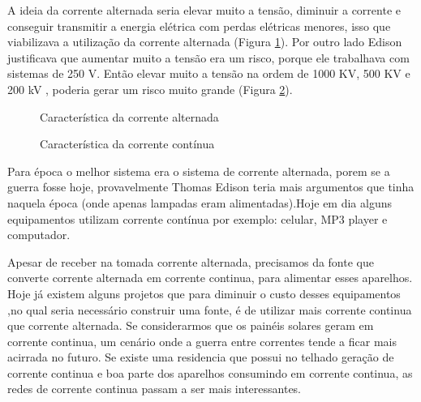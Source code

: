 A ideia da corrente alternada seria elevar muito a tensão, diminuir
a corrente e conseguir transmitir a energia elétrica com perdas elétricas
menores, isso que viabilizava a utilização da corrente alternada (Figura \ref{fig:corrente-alternada}).
Por outro lado Edison justificava que aumentar muito a tensão era
um risco, porque ele trabalhava com sistemas de 250 V. Então elevar
muito a tensão na ordem de 1000 KV, 500 KV e 200 kV , poderia gerar
um risco muito grande (Figura \ref{fig:corrente-continua}). 
\begin{figure}[H]
\begin{center}
\caption{\label{fig:corrente-alternada} Característica da corrente alternada}
\end{center}
\end{figure}




\begin{figure}[H]
\begin{center}
\caption{\label{fig:corrente-continua}Característica da corrente contínua}
\end{center}
\end{figure}

Para época o melhor sistema era o sistema de corrente alternada, porem
se a guerra fosse hoje, provavelmente Thomas Edison teria mais argumentos
que tinha naquela época (onde apenas lampadas eram alimentadas).Hoje
em dia alguns equipamentos utilizam corrente contínua por exemplo:
celular, MP3 player e computador.

Apesar de receber na tomada corrente alternada, precisamos da fonte
que converte corrente alternada em corrente continua, para alimentar
esses aparelhos. Hoje já existem alguns projetos que para diminuir
o custo desses equipamentos ,no qual seria necessário construir uma
fonte, é de utilizar mais corrente continua que corrente alternada.
Se considerarmos que os painéis solares geram em corrente continua,
um cenário onde a guerra entre correntes tende a ficar mais acirrada
no futuro. Se existe uma residencia que possui no telhado geração
de corrente continua e boa parte dos aparelhos consumindo em corrente
continua, as redes de corrente continua passam a ser mais interessantes.

